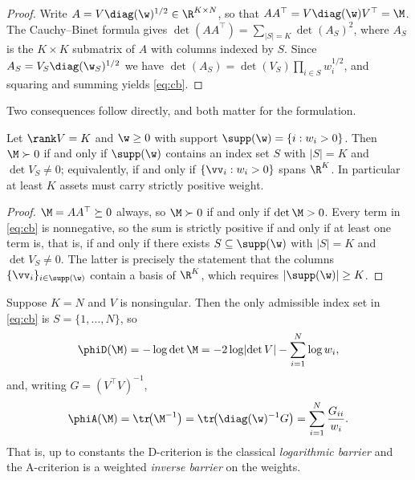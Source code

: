\begin{proof}
Write $A=V\diag(\w)^{1/2}\in\R^{K\times N}$, so that $AA^\top=V\diag(\w)V^\top=\M$.
The Cauchy--Binet formula gives
$\det(AA^\top)=\sum_{\lvert S\rvert=K}\det(A_S)^2$, where $A_S$ is the
$K\times K$ submatrix of $A$ with columns indexed by $S$. Since
$A_S=V_S\diag(\w_S)^{1/2}$ we have
$\det(A_S)=\det(V_S)\prod_{i\in S}w_i^{1/2}$, and squaring and summing yields
\eqref{eq:cb}.
\end{proof}

Two consequences follow directly, and both matter for the formulation.

\begin{corollary}
\label{cor:spanning}
Let $\rank V=K$ and $\w\ge0$ with support
$\supp(\w)=\{i:w_i>0\}$. Then $\M\succ0$ if and only if $\supp(\w)$ contains an
index set $S$ with $\lvert S\rvert=K$ and $\det V_S\neq0$; equivalently, if and
only if $\{\vv_i:w_i>0\}$ spans $\R^{K}$. In particular at least $K$ assets must
carry strictly positive weight.
\end{corollary}

\begin{proof}
$\M=AA^\top\succeq0$ always, so $\M\succ0$ if and only if $\det\M>0$. Every term
in \eqref{eq:cb} is nonnegative, so the sum is strictly positive if and only if
at least one term is, that is, if and only if there exists $S\subseteq\supp(\w)$
with $\lvert S\rvert=K$ and $\det V_S\neq0$. The latter is precisely the
statement that the columns $\{\vv_i\}_{i\in\supp(\w)}$ contain a basis of
$\R^{K}$, which requires $\lvert\supp(\w)\rvert\ge K$.
\end{proof}

\begin{corollary}
\label{cor:KN}
Suppose $K=N$ and $V$ is nonsingular. Then the only admissible index set in
\eqref{eq:cb} is $S=\{1,\dots,N\}$, so
\begin{equation}
  \phiD(\M)=-\log\det\M=-2\log\lvert\det V\rvert-\sum_{i=1}^{N}\log w_i ,
  \label{eq:Dbarrier}
\end{equation}
and, writing $G=(V^\top V)^{-1}$,
\begin{equation}
  \phiA(\M)=\tr\!\big(\M^{-1}\big)
  =\tr\!\big(\diag(\w)^{-1}G\big)
  =\sum_{i=1}^{N}\frac{G_{ii}}{w_i}.
  \label{eq:Abarrier}
\end{equation}
That is, up to constants the D-criterion is the classical \emph{logarithmic
barrier} and the A-criterion is a weighted \emph{inverse barrier} on the weights.
\end{corollary}

